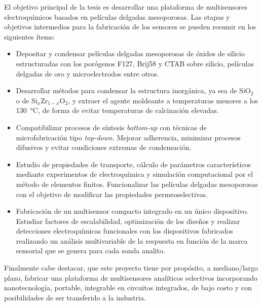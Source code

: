 	El objetivo principal de la tesis es desarrollar una plataforma de multisensores electroquímicos basados en películas delgadas mesoporosas. Las etapas y objetivos intermedios para la fabricación de los sensores se pueden resumir en los siguientes ítems:

	\begin{itemize}
		
		\item Depositar y condensar películas delgadas mesoporosas de óxidos de silicio estructuradas con los porógenos F127, Brij58 y CTAB sobre silicio, películas delgadas de oro y microelectrodos entre otros.  
		
		\item Desarrollar métodos para condensar la estructura inorgánica, ya sea de SiO$_2$ o de Si$_{x}$Zr$_{1-x}$O$_2$, y extraer el agente moldeante a temperaturas menores a los \SI{130}{\celsius}, de forma de evitar temperaturas de calcinación elevadas.

		\item Compatibilizar procesos de síntesis \textit{bottom-up} con técnicas de microfabricación tipo \textit{top-down}. Mejorar adherencia, minimizar procesos difusivos y evitar condiciones extremas de condensación.

		\item Estudio de propiedades de transporte, cálculo de parámetros característicos mediante experimentos de electroquímica y simulación computacional por el método de elementos finitos. Funcionalizar las películas delgadas mesoporosas con el objetivo de modificar las propiedades permeoselectivas.

		\item Fabricación de un multisensor compacto integrado en un único dispositivo. Estudiar factores de escalabilidad, optimización de los diseños y realizar detecciones electroquímicas funcionales con los dispositivos fabricados realizando un análisis multivariable de la respuesta en función de la marca sensorial que se genera para cada sonda analito.

		\end{itemize}	

	Finalmente cabe destacar, que este proyecto tiene por propósito, a mediano/largo plazo, fabricar una plataforma de multisensores analíticos selectivos incorporando nanotecnología, portable, integrable en circuitos integrados, de bajo costo y con posibilidades de ser transferido a la industria.